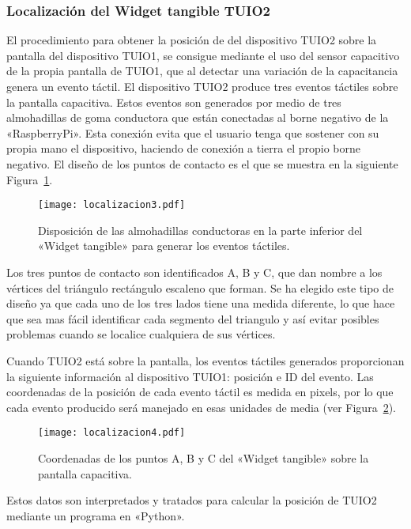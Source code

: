 \subsubsection{Localización del Widget tangible TUIO2}

El procedimiento para obtener la posición de del dispositivo TUIO2 sobre la pantalla del dispositivo TUIO1, se consigue mediante el uso del sensor capacitivo de la propia pantalla de TUIO1, que al detectar una variación de la capacitancia genera un evento táctil.
El dispositivo TUIO2 produce tres eventos táctiles sobre la pantalla capacitiva. Estos eventos son generados por medio de tres almohadillas de goma conductora que están conectadas al borne negativo de la «RaspberryPi». Esta conexión evita que el usuario tenga que sostener con su propia mano el dispositivo, haciendo de conexión a tierra el propio borne negativo.
El diseño de los puntos de contacto es el que se muestra en la siguiente Figura~\ref{fig:Localizacion3}.
\begin{figure}[!h]
\begin{center}
\texttt{[image: localizacion3.pdf]}
\caption{Disposición de las almohadillas conductoras en la parte inferior del «Widget tangible» para generar los eventos táctiles. }
\label{fig:Localizacion3}
\end{center}
\end{figure}
Los tres puntos de contacto son identificados A, B y C, que dan nombre a los vértices del triángulo rectángulo escaleno que forman. Se ha elegido este tipo de diseño ya que cada uno de los tres lados tiene una medida diferente, lo que hace que sea mas fácil identificar cada segmento del triangulo y así evitar posibles problemas cuando se localice cualquiera de sus vértices.

Cuando TUIO2 está sobre la pantalla, los eventos táctiles generados proporcionan la siguiente información al dispositivo TUIO1: posición e ID del evento. Las coordenadas de la posición de cada evento táctil es medida en pixels, por lo que cada evento producido será manejado en esas unidades de media (ver Figura~\ref{fig:Localizacion4}).\\
\begin{figure}[!h]
\begin{center}
\texttt{[image: localizacion4.pdf]}
\caption{Coordenadas de los puntos A, B y C del «Widget tangible» sobre la pantalla capacitiva. }
\label{fig:Localizacion4}
\end{center}
\end{figure}
Estos datos son interpretados y tratados para calcular la posición de TUIO2 mediante un programa en «Python».

